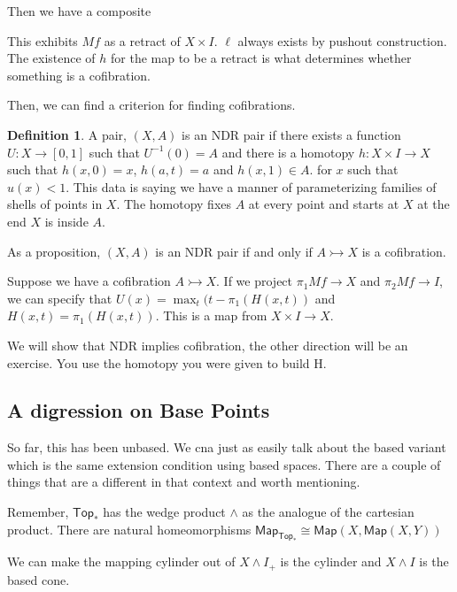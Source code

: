 \documentclass[12pt]{article}
\theoremstyle{definition}
\newtheorem{definition}[theorem]{Definition}
\begin{document}
	Then we have a composite\begin{center}
	\end{center}
	This exhibits $Mf$ as a retract of $X\times I$. $\ell$ always exists by pushout construction. The existence of $h$ for the map to be a retract is what determines whether something is a cofibration. 
	
	Then, we can find a criterion for finding cofibrations. 
	\begin{definition}
		A pair, $(X,A)$ is an NDR pair if there exists a function $U:X\to [0,1]$ such that $U^{-1}(0)=A$ and there is a homotopy $h:X\times I\to X$ such that $h(x,0)=x$, $h(a,t)=a$ and $h(x,1)\in A$. for $x$ such that $u(x)<1$. This data is saying we have a manner of parameterizing families of shells of points in $X$. The homotopy fixes $A$ at every point and starts at $X$ at the end $X$ is inside $A$.
	\end{definition}
	
	As a proposition, $(X,A)$ is an NDR pair if and only if $A\rightarrowtail X$ is a cofibration. 
	
	Suppose we have a cofibration $A\rightarrowtail X$. If we project $\pi_1 Mf\to X$ and $\pi_2 Mf\to I$, we can specify that $U(x)=\max_t(t-\pi_1(H(x,t))$ and $H(x,t)=\pi_1(H(x,t))$. This is a map from $X\times I\to X$. 
	
	We will show that NDR implies cofibration, the other direction will be an exercise. You use the homotopy you were given to build H.
	
	\subsection{A digression on Base Points}
	So far, this has been unbased. We cna just as easily talk about the based variant which is the same extension condition using based spaces. There are a couple of things that are a different in that context and worth mentioning. 
	
	Remember, $\mathsf{Top}_*$ has the wedge product $\wedge$ as the analogue of the cartesian product. There are natural homeomorphisms 
	$\mathsf{Map}_{\mathsf{Top}_*} \cong \mathsf{Map}(X,\mathsf{Map}(X,Y))$ 
	
	We can make the mapping cylinder out of $X\wedge I_+$ is the cylinder and $X\wedge I$ is the based cone. 
	
\end{document}
